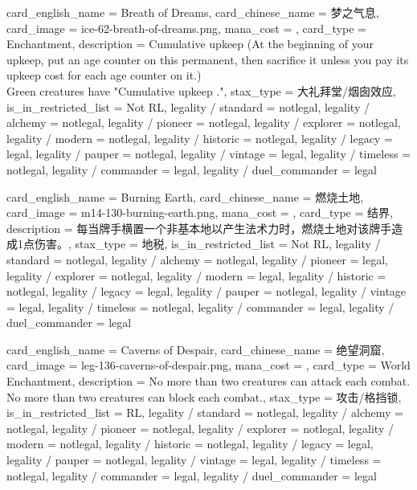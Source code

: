 \documentclass[lang = cn, color = black, 10pt]{AllThatStax}
\begin{document}
\card
{
	card_english_name = {Breath of Dreams},
	card_chinese_name = {梦之气息},
	card_image = ice-62-breath-of-dreams.png,
	mana_cost = ,
	card_type = Enchantment,
	description = {Cumulative upkeep  (At the beginning of your upkeep, put an age counter on this permanent, then sacrifice it unless you pay its upkeep cost for each age counter on it.)\\
		Green creatures have "Cumulative upkeep ."},
	stax_type = 大礼拜堂/烟囱效应,
	is_in_restricted_list = Not RL,
	legality / standard = notlegal,
	legality / alchemy = notlegal,
	legality / pioneer = notlegal,
	legality / explorer = notlegal,
	legality / modern = notlegal,
	legality / historic = notlegal,
	legality / legacy = legal,
	legality / pauper = notlegal,
	legality / vintage = legal,
	legality / timeless = notlegal,
	legality / commander = legal,
	legality / duel_commander = legal
}

\card
{
	card_english_name = {Burning Earth},
	card_chinese_name = {燃烧土地},
	card_image = m14-130-burning-earth.png,
	mana_cost = ,
	card_type = 结界,
	description = {每当牌手横置一个非基本地以产生法术力时，燃烧土地对该牌手造成1点伤害。},
	stax_type = 地税,
	is_in_restricted_list = Not RL,
	legality / standard = notlegal,
	legality / alchemy = notlegal,
	legality / pioneer = legal,
	legality / explorer = notlegal,
	legality / modern = legal,
	legality / historic = notlegal,
	legality / legacy = legal,
	legality / pauper = notlegal,
	legality / vintage = legal,
	legality / timeless = notlegal,
	legality / commander = legal,
	legality / duel_commander = legal
}

\card
{
	card_english_name = {Caverns of Despair},
	card_chinese_name = {绝望洞窟},
	card_image = leg-136-caverns-of-despair.png,
	mana_cost = ,
	card_type = World Enchantment,
	description = {No more than two creatures can attack each combat.\\
		No more than two creatures can block each combat.},
	stax_type = 攻击/格挡锁,
	is_in_restricted_list = RL,
	legality / standard = notlegal,
	legality / alchemy = notlegal,
	legality / pioneer = notlegal,
	legality / explorer = notlegal,
	legality / modern = notlegal,
	legality / historic = notlegal,
	legality / legacy = legal,
	legality / pauper = notlegal,
	legality / vintage = legal,
	legality / timeless = notlegal,
	legality / commander = legal,
	legality / duel_commander = legal
}
\end{document}
